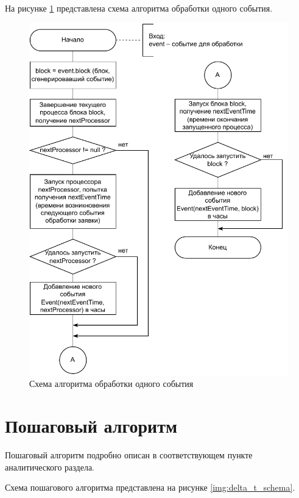 \clearpage
На рисунке \ref{img:hybrid_processEvent_schema} представлена схема алгоритма обработки одного события.
\begin{figure}[h!btp]
	\centering
	\includegraphics[width=0.8\columnwidth]{inc/img/hybrid_processEvent_schema.pdf}
	\caption{Схема алгоритма обработки одного события}
	\label{img:hybrid_processEvent_schema}	
\end{figure}

\clearpage
\section{Пошаговый алгоритм}
Пошаговый алгоритм подробно описан в соответствующем пункте аналитического раздела. 

Схема пошагового алгоритма представлена на рисунке \ref{img:delta_t_schema}.

